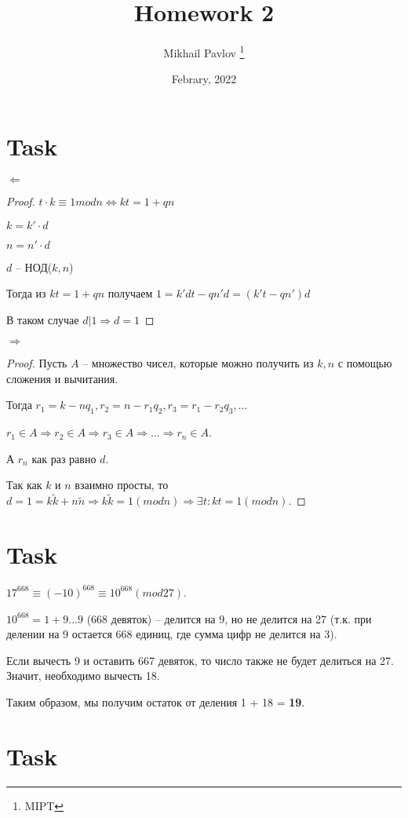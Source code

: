 \documentclass[12pt, a4paper]{article}
\title{Homework 2}
\author{Mikhail Pavlov \thanks{MIPT}}
\date{Febrary, 2022}
\theoremstyle{definition}
\begin{document}
\section{Task}

$\Leftarrow$

\begin{proof}
    $t \cdot k \equiv 1 mod n \Leftrightarrow kt = 1 + qn$

    $k = k' \cdot d$

    $n = n' \cdot d$

    $d$ -- НОД($k, n$)

    Тогда из $kt = 1 + qn$ получаем $1 = k'dt - qn'd = (k't - qn')d$

    В таком случае $d | 1 \Rightarrow d = 1$
\end{proof}

$\Rightarrow$

\begin{proof}
    Пусть $A$ -- множество чисел, которые можно получить из $k, n$ с помощью сложения и вычитания.

    Тогда $r_1 = k - nq_1, r_2 = n - r_1q_2, r_3 = r_1 - r_2q_3, ...$

    $r_1 \in A \Rightarrow r_2 \in A \Rightarrow r_3 \in A \Rightarrow ... \Rightarrow r_n \in A$.

    А $r_n$ как раз равно $d$.

    Так как $k$ и $n$ взаимно просты, то $d = 1 = k \widetilde{k} + n \widetilde{n} \Rightarrow k \widetilde{k} = 1 (mod n) \Rightarrow \exists t : kt = 1 (mod n)$.

\end{proof}

\section{Task}

    $17^{668} \equiv (-10)^{668} \equiv 10^{668} (mod 27)$.

    $10^{668} = 1 + 9...9$ (668 девяток) -- делится на 9, но не делится на 27 (т.к. при делении на 9 остается 668 единиц, где сумма цифр не делится на 3).

    Если вычесть 9 и оставить 667 девяток, то число также не будет делиться на 27. Значит, необходимо вычесть 18.

    Таким образом, мы получим остаток от деления 1 + 18 = \textbf{19}.

\section{Task}
\end{document}
